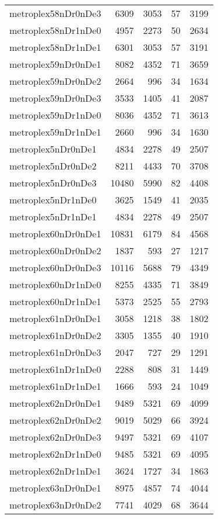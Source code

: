 \begin{longtable}{lrrrr}
metroplex58nDr0nDe3 & 6309 & 3053 & 57 & 3199 \\
metroplex58nDr1nDe0 & 4957 & 2273 & 50 & 2634 \\
metroplex58nDr1nDe1 & 6301 & 3053 & 57 & 3191 \\
metroplex59nDr0nDe1 & 8082 & 4352 & 71 & 3659 \\
metroplex59nDr0nDe2 & 2664 & 996 & 34 & 1634 \\
metroplex59nDr0nDe3 & 3533 & 1405 & 41 & 2087 \\
metroplex59nDr1nDe0 & 8036 & 4352 & 71 & 3613 \\
metroplex59nDr1nDe1 & 2660 & 996 & 34 & 1630 \\
metroplex5nDr0nDe1 & 4834 & 2278 & 49 & 2507 \\
metroplex5nDr0nDe2 & 8211 & 4433 & 70 & 3708 \\
metroplex5nDr0nDe3 & 10480 & 5990 & 82 & 4408 \\
metroplex5nDr1nDe0 & 3625 & 1549 & 41 & 2035 \\
metroplex5nDr1nDe1 & 4834 & 2278 & 49 & 2507 \\
metroplex60nDr0nDe1 & 10831 & 6179 & 84 & 4568 \\
metroplex60nDr0nDe2 & 1837 & 593 & 27 & 1217 \\
metroplex60nDr0nDe3 & 10116 & 5688 & 79 & 4349 \\
metroplex60nDr1nDe0 & 8255 & 4335 & 71 & 3849 \\
metroplex60nDr1nDe1 & 5373 & 2525 & 55 & 2793 \\
metroplex61nDr0nDe1 & 3058 & 1218 & 38 & 1802 \\
metroplex61nDr0nDe2 & 3305 & 1355 & 40 & 1910 \\
metroplex61nDr0nDe3 & 2047 & 727 & 29 & 1291 \\
metroplex61nDr1nDe0 & 2288 & 808 & 31 & 1449 \\
metroplex61nDr1nDe1 & 1666 & 593 & 24 & 1049 \\
metroplex62nDr0nDe1 & 9489 & 5321 & 69 & 4099 \\
metroplex62nDr0nDe2 & 9019 & 5029 & 66 & 3924 \\
metroplex62nDr0nDe3 & 9497 & 5321 & 69 & 4107 \\
metroplex62nDr1nDe0 & 9485 & 5321 & 69 & 4095 \\
metroplex62nDr1nDe1 & 3624 & 1727 & 34 & 1863 \\
metroplex63nDr0nDe1 & 8975 & 4857 & 74 & 4044 \\
metroplex63nDr0nDe2 & 7741 & 4029 & 68 & 3644 \\

\end{longtable}
